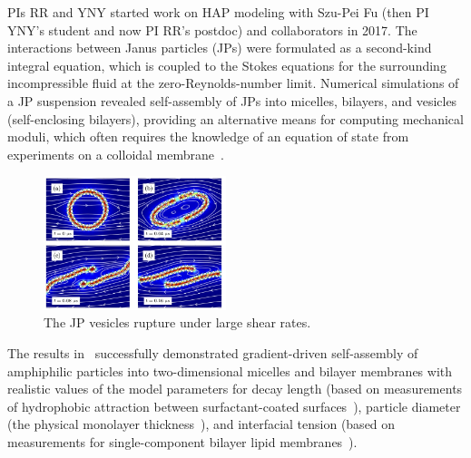 PIs RR and YNY started work on HAP modeling with Szu-Pei Fu (then PI
YNY's student and now PI RR's postdoc) and collaborators in 2017. The
interactions between Janus particles (JPs) were formulated as a
second-kind integral equation, which is coupled to the Stokes equations
for the surrounding incompressible fluid at the zero-Reynolds-number
limit. Numerical simulations of a JP suspension revealed self-assembly
of JPs into micelles, bilayers, and vesicles (self-enclosing bilayers),
providing an alternative means for computing mechanical moduli, which
often requires the knowledge of an equation of state from experiments on
a colloidal membrane~\cite{Balchunas2019_SM}.

\begin{figure}
\includegraphics[width=0.475\textwidth]{figures/Rupture.jpg}
\caption{\label{fig:JPv_rupture}The JP vesicles rupture under large shear rates.}
\end{figure}
%
The results in~\cite{Fu2018_SIAM}
successfully demonstrated gradient-driven
self-assembly of amphiphilic particles into two-dimensional micelles and
bilayer membranes with realistic values of the model parameters
for decay
length %
(based on measurements of hydrophobic attraction
between surfactant-coated surfaces~\cite{ErLjCl89, Lin2005,
  Parsegian, Israelachvili80}), particle diameter %
(the
physical monolayer thickness~\cite{Boal}), and interfacial tension
(based on measurements for single-component
bilayer lipid membranes~\cite{GarciaSaez, KUZMIN2005, Petelska2012,
Jackson2016}).
%
